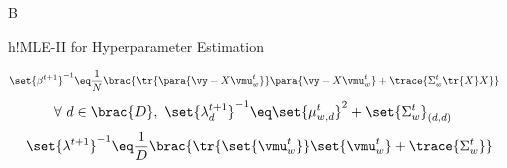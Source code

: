 \documentclass{article}
\begin{document}
\begin{question}
\begin{qpart}{B}
\begin{algo}[0.9\textwidth]{h!}{MLE-II for Hyperparameter Estimation}
\begin{enumerate}
\begin{enumerate}
							\begin{align*}
								\set{\beta^{t + 1}}^{-1}	&\eq	\frac{1}{N} \brac{\tr{\para{\vy - X \vmu_w^t}} \para{\vy - X \vmu_w^t} + \trace{\Sigma_w^t \tr{X} X}}
							\end{align*}
							\begin{align*}
								\forall\ d \in \brac{D},\ \set{\lambda_d^{t + 1}}^{-1}	&\eq	\set{\mu_{w, d}^t}^2 + \set{\Sigma_w^t}_{(d, d)}
							\end{align*}
							\begin{align*}
								\set{\lambda^{t + 1}}^{-1}	\eq	\frac{1}{D} \brac{\tr{\set{\vmu_w^t}} \set{\vmu_w^t} + \trace{\Sigma_w^t}}
							\end{align*}
					\end{enumerate}
			\end{enumerate}

		\end{algo}

	\end{qpart}

\end{question}
\end{document}
